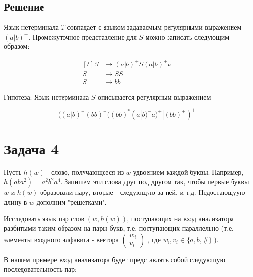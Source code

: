 \documentclass[a4paper, 14pt]{article}
\begin{document}
\subsection{Решение}

Язык нетерминала $T$ совпадает с языком задаваемым регулярными выражением $(a|b)^{+}$.
Промежуточное представление для $S$ можно записать следующим образом:

\begin{equation*}
	\begin{aligned}[t]
		S &\rightarrow (a|b)^{+}S(a|b)^{+}a\\  
		S &\rightarrow SS\\
		S &\rightarrow bb
	\end{aligned}
\end{equation*}


Гипотеза: Язык нетерминала $S$ описывается регулярным выражением

$$((a|b)^{+}(bb)^{+}((bb)^{*}(a|b)^{+}a)^{+} | (bb)^{+})^{+}$$

\newpage 

\section{Задача 4}

Пусть $h(w)$ - слово, получающееся из $w$ удвоением каждой буквы. Например, $h(aba^2) = a^{2}b^{2}a^{4}$. Запишем эти слова друг под другом так, чтобы первые буквы $w$ и $h(w)$ образовали пару, вторые - следующую за ней, и т.д. Недостающуую длину в $w$ дополним "решетками".

Исследовать язык пар слов $(w, h(w))$, поступающих на вход анализатора разбитыми таким образом на пары букв, т.е. поступающих параллельно (т.е. элементы входного алфавита - вектора
$
\begin{pmatrix}
	w_i\\
	v_i
\end{pmatrix}
$ 
, где $w_i, v_i \in \{a, b, \# \}$
). 

В нашем примере вход анализатора будет представлять собой следующую последовательность пар:
\end{document}
